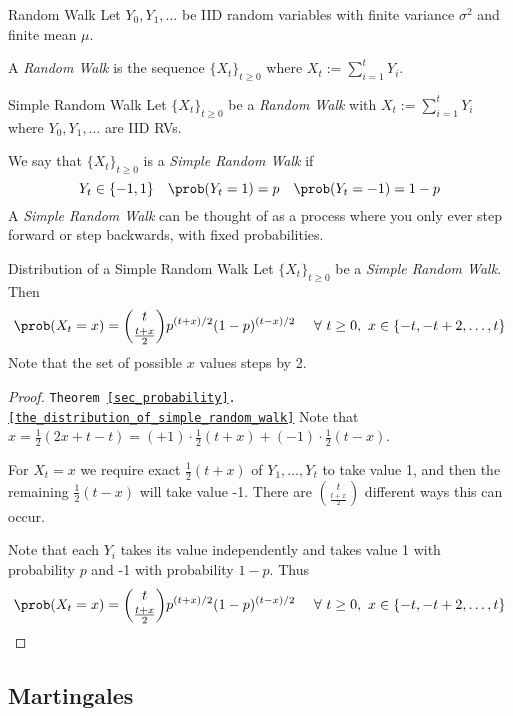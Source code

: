 \documentclass[11pt,a4paper]{article}
\begin{document}
  \begin{definition}{Random Walk}
    Let $Y_0,Y_1,\dots$ be IID random variables with finite variance $\sigma^2$ and finite mean $\mu$.
    \par A \textit{Random Walk} is the sequence $\{X_t\}_{t\geq0}$ where $X_t:=\sum_{i=1}^tY_i$.
  \end{definition}

  \begin{definition}{Simple Random Walk}
    Let $\{X_t\}_{t\geq0}$ be a \textit{Random Walk} with $X_t:=\sum_{i=1}^tY_i$ where $Y_0,Y_1,\dots$ are IID RVs.
    \par We say that $\{X_t\}_{t\geq0}$ is a \textit{Simple Random Walk} if
    \[ Y_t\in\{-1,1\}\quad\prob(Y_t=1)=p\quad\prob(Y_t=-1)=1-p \]
    A \textit{Simple Random Walk} can be thought of as a process where you only ever step forward or step backwards, with fixed probabilities.
  \end{definition}

  \begin{theorem}{Distribution of a Simple Random Walk}\label{the_distribution_of_simple_random_walk}
    Let $\{X_t\}_{t\geq0}$ be a \textit{Simple Random Walk}. Then
    \[ \prob(X_t=x)={t \choose {\frac{t+x}2}}p^{(t+x)/2}(1-p)^{(t-x)/2}\quad\ \forall\ t\geq0,\ x\in\{-t,-t+2,\dots,t\} \]
    Note that the set of possible $x$ values steps by 2.
  \end{theorem}

  \begin{proof}{\texttt{Theorem \ref{sec_probability}.\ref{the_distribution_of_simple_random_walk}}}
    Note that $x=\frac12(2x+t-t)=(+1)\cdot\frac12(t+x)+(-1)\cdot\frac12(t-x)$.
    \par For $X_t=x$ we require exact $\frac12(t+x)$ of $Y_1,\dots,Y_t$ to take value 1, and then the remaining $\frac12(t-x)$ will take value -1. There are ${t\choose{\frac{t+x}2}}$ different ways this can occur.
    \par Note that each $Y_i$ takes its value independently and takes value 1 with probability $p$ and -1 with probability $1-p$. Thus
    \[ \prob(X_t=x)={t \choose {\frac{t+x}2}}p^{(t+x)/2}(1-p)^{(t-x)/2}\quad\ \forall\ t\geq0,\ x\in\{-t,-t+2,\dots,t\} \]
  \end{proof}

\subsection{Martingales}
\end{document}
